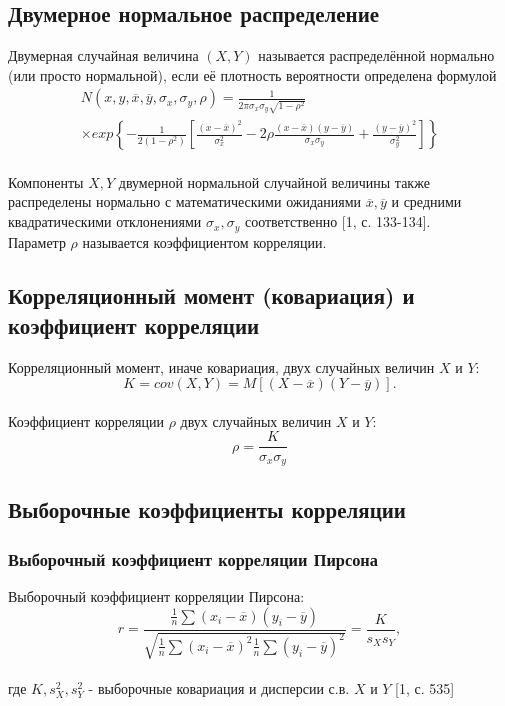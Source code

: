 \subsection {Двумерное нормальное распределение}
	Двумерная случайная величина $(X, Y)$ называется распределённой нормально (или просто нормальной), если её плотность вероятности определена формулой\\ \begin{eqnarray}N(x, y, \overline x, \overline y, \sigma_x, \sigma_y, \rho) = \frac{1}{2\pi\sigma_x\sigma_y\sqrt{1 - \rho^2}} \nonumber
\\\times exp\left\{-\frac{1}{2(1 - \rho^2)}\left[ \frac{(x - \overline x)^2}{\sigma_x^2} - 2\rho\frac{(x - \overline x)(y - \overline y)}{\sigma_x\sigma_y} + \frac{(y - \overline y)^2}{\sigma_y^2}\right] \right\}\end{eqnarray}\\

	Компоненты $X, Y$ двумерной нормальной случайной величины также распределены нормально с математическими ожиданиями $\overline x, \overline y$ и средними квадратическими отклонениями $\sigma_x, \sigma_y$ соответственно [1, с. 133-134].\\

Параметр $\rho$ называется коэффициентом корреляции.

\subsection {Корреляционный момент (ковариация) и коэффициент корреляции}
	Корреляционный момент, иначе ковариация, двух случайных величин $X$ и $Y$:\\
	\begin{equation}K = cov(X, Y) = M[(X - \overline x)(Y - \overline y)].\end{equation}\\
	Коэффициент корреляции $\rho$ двух случайных величин $X$ и $Y$:\\
	\begin{equation}\rho = \frac{K}{\sigma_x\sigma_y}\end{equation}

\subsection {Выборочные коэффициенты корреляции}
	\subsubsection {Выборочный коэффициент корреляции Пирсона}
		Выборочный коэффициент корреляции Пирсона:
		\begin{equation}r = \frac{\frac{1}{n}\sum(x_i - \overline x)(y_i - \overline y)}{\sqrt{\frac{1}{n}\sum(x_i - \overline x)^2\frac{1}{n} \sum(y_i - \overline y)^2}} = \frac {K}{s_Xs_Y},\end{equation}\\ где $K, s_X^2, s_Y^2$ - выборочные ковариация и дисперсии с.в. $X$ и $Y$ [1, с. 535]

